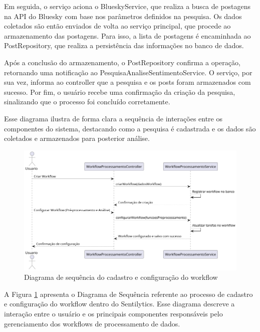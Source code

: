\documentclass[
	12pt,				%
	oneside,			%
	a4paper,			%
	english,			%
	french,				%
	spanish,			%
	brazil				%
	]{abntex2}
\begin{document}
Em seguida, o serviço aciona o BlueskyService, que realiza a busca de
postagens na API do Bluesky com base nos parâmetros definidos na
pesquisa. Os dados coletados são então enviados de volta ao serviço
principal, que procede ao armazenamento das postagens. Para isso, a
lista de postagens é encaminhada ao PostRepository, que realiza a
persistência das informações no banco de dados.

Após a conclusão do armazenamento, o PostRepository confirma a operação,
retornando uma notificação ao PesquisaAnaliseSentimentoService. O
serviço, por sua vez, informa ao controller que a pesquisa e os posts
foram armazenados com sucesso. Por fim, o usuário recebe uma confirmação
da criação da pesquisa, sinalizando que o processo foi concluído
corretamente.

Esse diagrama ilustra de forma clara a sequência de interações entre os
componentes do sistema, destacando como a pesquisa é cadastrada e os
dados são coletados e armazenados para posterior análise.

\begin{figure}[htbp]
\hypertarget{seq_cadastro_configuracao_workflow}{%
\caption{Diagrama de sequência do cadastro e configuração do workflow}\label{seq_cadastro_configuracao_workflow}
\begin{center}
\includegraphics[scale=0.4]{imagens/sentilytics/diagramas/sequencia-cadastro-configuracao-workflow.png}
\end{center}
}
\end{figure}

A Figura \ref{seq_cadastro_configuracao_workflow} apresenta o Diagrama
de Sequência referente ao processo de cadastro e configuração do
workflow dentro do Sentilytics. Esse diagrama descreve a interação entre
o usuário e os principais componentes responsáveis pelo gerenciamento
dos workflows de processamento de dados.
\end{document}
